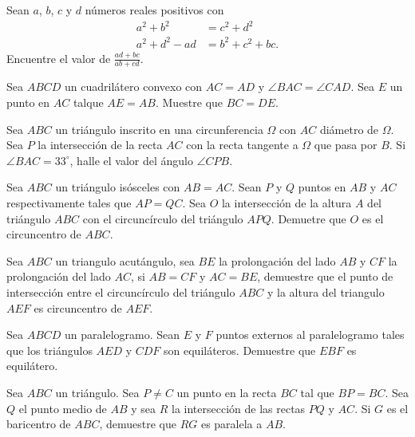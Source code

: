 \begin{problem}
Sean $a$, $b$, $c$ y $d$ números reales positivos con
\begin{align*}
	a^2 + b^2      & =       c^2 + d^2  \\
	a^2 + d^2 - ad & =  b^2 + c^2 + bc.
\end{align*}
Encuentre el valor de $\frac{ad + bc}{ab + cd}$.
\end{problem}

\begin{problem}
Sea $ABCD$ un cuadrilátero convexo con
$AC = AD$ y $\angle BAC = \angle CAD$.
Sea $E$ un punto en $AC$ talque $AE = AB$.
Muestre que $BC = DE$.
\end{problem}

\begin{problem}
Sea $ABC$ un triángulo inscrito en una circunferencia $\Omega$ con
$AC$ diámetro de $\Omega$. Sea $P$ la intersección de la recta $AC$ con
la recta tangente a $\Omega$ que pasa por $B$. Si $\angle BAC = 33^\circ$,
halle el valor del ángulo $\angle CPB$.
\end{problem}

\begin{problem}
Sea $ABC$ un triángulo isósceles con $AB = AC$. Sean $P$ y $Q$ puntos
en $AB$ y $AC$ respectivamente tales que $AP = QC$. Sea $O$
la intersección de la altura $A$ del triángulo $ABC$ con el
circuncírculo del triángulo $APQ$. Demuetre que $O$ es el
circuncentro de $ABC$.
\end{problem}

\begin{problem}
Sea $ABC$ un triangulo acutángulo, sea $BE$ la prolongación del lado $AB$ y $CF$
la prolongación del lado $AC$, si $AB=CF$ y $AC=BE$, demuestre que el punto
de intersección entre el circuncírculo del triángulo $ABC$ y la altura
del triangulo $AEF$ es circuncentro de $AEF$.
\end{problem}

\begin{problem}
Sea $ABCD$ un paralelogramo. Sean $E$ y $F$ puntos externos al
paralelogramo tales que los triángulos $AED$ y $CDF$ son equiláteros.
Demuestre que $EBF$ es equilátero.
\end{problem}

\begin{problem}
Sea $ABC$ un triángulo. Sea $P \neq C$ un punto en la recta $BC$ tal que $BP = BC$.
Sea $Q$ el punto medio de $AB$ y sea $R$ la intersección de las rectas $PQ$ y $AC$.
Si $G$ es el baricentro de $ABC$, demuestre que $RG$ es paralela a $AB$.
\end{problem}


